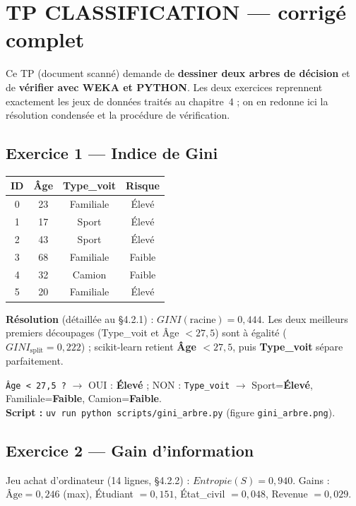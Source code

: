 \chapter{TP \og CLASSIFICATION \fg{} — corrigé complet}

Ce TP (document scanné) demande de \textbf{dessiner deux arbres de décision} et de
\textbf{vérifier avec WEKA et PYTHON}. Les deux exercices reprennent exactement les jeux de
données traités au chapitre~4 ; on en redonne ici la résolution condensée et la procédure de
vérification.

\section{Exercice 1 — Indice de Gini}
\begin{center}\small
\begin{tabular}{cccc}
\toprule
ID & Âge & Type\_voit & Risque\\
\midrule
0 & 23 & Familiale & Élevé\\ 1 & 17 & Sport & Élevé\\ 2 & 43 & Sport & Élevé\\
3 & 68 & Familiale & Faible\\ 4 & 32 & Camion & Faible\\ 5 & 20 & Familiale & Élevé\\
\bottomrule
\end{tabular}
\end{center}

\textbf{Résolution} (détaillée au \S4.2.1) : $GINI(\text{racine})=0{,}444$. Les deux meilleurs
premiers découpages (Type\_voit et Âge $<27{,}5$) sont à égalité ($GINI_{\text{split}}=0{,}222$) ;
scikit-learn retient \textbf{Âge $<27{,}5$}, puis \textbf{Type\_voit} sépare parfaitement.

\begin{Exemple}
\texttt{Âge < 27,5 ?} $\rightarrow$ OUI : \textbf{Élevé} ; NON : \texttt{Type\_voit} $\rightarrow$ Sport=\textbf{Élevé},
Familiale=\textbf{Faible}, Camion=\textbf{Faible}. \\
\textbf{Script :} \texttt{uv run python scripts/gini\_arbre.py} (figure \texttt{gini\_arbre.png}).
\end{Exemple}

\section{Exercice 2 — Gain d'information}
Jeu \og achat d'ordinateur \fg{} (14 lignes, \S4.2.2) : $Entropie(S)=0{,}940$. Gains :
$\text{Âge}=0{,}246$ (max), Étudiant $=0{,}151$, État\_civil $=0{,}048$, Revenue $=0{,}029$.

